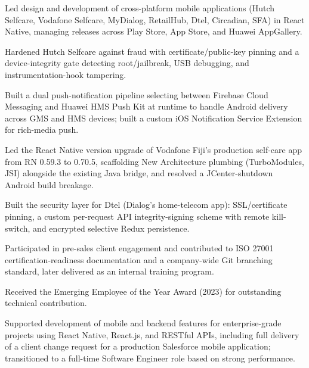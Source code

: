 \documentclass[10.5pt]{article}
\begin{document}
\begin{cvitems}
  \item Led design and development of cross-platform mobile applications (Hutch Selfcare, Vodafone Selfcare, MyDialog, RetailHub, Dtel, Circadian, SFA) in React Native, managing releases across Play Store, App Store, and Huawei AppGallery.
  \item Hardened Hutch Selfcare against fraud with certificate/public-key pinning and a device-integrity gate detecting root/jailbreak, USB debugging, and instrumentation-hook tampering.
  \item Built a dual push-notification pipeline selecting between Firebase Cloud Messaging and Huawei HMS Push Kit at runtime to handle Android delivery across GMS and HMS devices; built a custom iOS Notification Service Extension for rich-media push.
  \item Led the React Native version upgrade of Vodafone Fiji's production self-care app from RN 0.59.3 to 0.70.5, scaffolding New Architecture plumbing (TurboModules, JSI) alongside the existing Java bridge, and resolved a JCenter-shutdown Android build breakage.
  \item Built the security layer for Dtel (Dialog's home-telecom app): SSL/certificate pinning, a custom per-request API integrity-signing scheme with remote kill-switch, and encrypted selective Redux persistence.
  \item Participated in pre-sales client engagement and contributed to ISO 27001 certification-readiness documentation and a company-wide Git branching standard, later delivered as an internal training program.
  \item Received the Emerging Employee of the Year Award (2023) for outstanding technical contribution.
\end{cvitems}

\begin{cvitems}
  \item Supported development of mobile and backend features for enterprise-grade projects using React Native, React.js, and RESTful APIs, including full delivery of a client change request for a production Salesforce mobile application; transitioned to a full-time Software Engineer role based on strong performance.
\end{cvitems}
\end{document}
